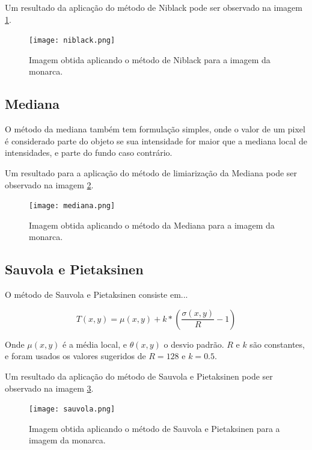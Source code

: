 \documentclass[conference]{IEEEtran}
\begin{document}
    Um resultado da aplicação do método de Niblack pode ser observado na imagem \ref{fig:nib}.

    \begin{figure}[ht]
        \centering
        \texttt{[image: niblack.png]}
        \caption{Imagem obtida aplicando o método de Niblack para a imagem da monarca.}
        \label{fig:nib}
    \end{figure}

\subsection{Mediana}

    O método da mediana também tem formulação simples, onde o valor de um pixel é considerado parte do objeto se sua intensidade for maior que a mediana local de intensidades, e parte do fundo caso contrário.

    Um resultado para a aplicação do método de limiarização da Mediana pode ser observado na imagem \ref{fig:med}.

    \begin{figure}[ht]
        \centering
        \texttt{[image: mediana.png]}
        \caption{Imagem obtida aplicando o método da Mediana para a imagem da monarca.}
        \label{fig:med}
    \end{figure}

\subsection{Sauvola e Pietaksinen}

    O método de Sauvola e Pietaksinen consiste em...

    \begin{equation}
        T(x,y) = \mu (x,y) + k * (\dfrac{\sigma (x,y)}{R} - 1)
    \end{equation}

    Onde $\mu (x,y)$ é a média local, e $\theta (x,y)$ o desvio padrão. $R$ e $k$ são constantes, e foram usados os valores sugeridos de $R = 128$ e $k = 0.5$.

    Um resultado da aplicação do método de Sauvola e Pietaksinen pode ser observado na imagem \ref{fig:sp}.

    \begin{figure}[ht]
        \centering
        \texttt{[image: sauvola.png]}
        \caption{Imagem obtida aplicando o método de Sauvola e Pietaksinen para a imagem da monarca.}
        \label{fig:sp}
    \end{figure}
\end{document}
